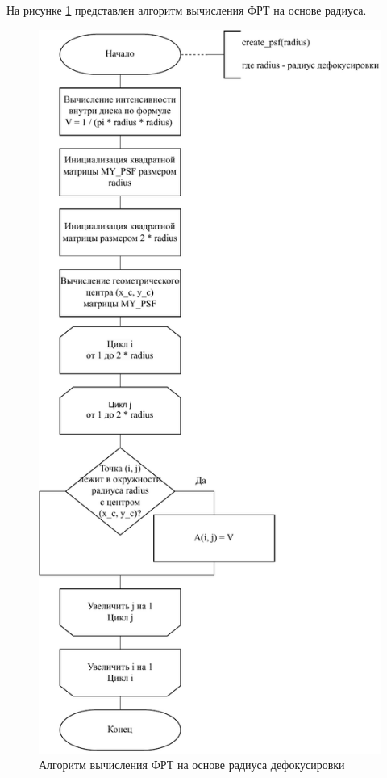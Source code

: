 \clearpage

На рисунке \ref{psf} представлен алгоритм вычисления ФРТ на основе радиуса.

\begin{figure}[H]
	\centering
	\includegraphics[scale=0.82]{assets/psf.pdf}
	\caption{Алгоритм вычисления ФРТ на основе радиуса дефокусировки}
	\label{psf}
\end{figure}

